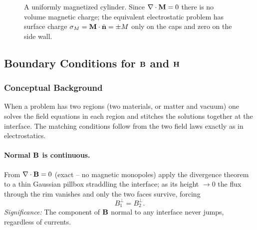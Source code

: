 \begin{figure}[h]
\centering
{}
\caption{A uniformly magnetized cylinder. Since $\nabla \cdot\mathbf{M}=0$ there is no volume
magnetic charge; the equivalent electrostatic problem has surface charge
$\sigma_M=\mathbf{M}\cdot\hat{\mathbf{n}}=\pm M$ only on the caps and zero on the side wall.}
\label{fig:lec18-bar-magnet}
\end{figure}

\subsection{Boundary Conditions for $\mathbf{B}$ and $\mathbf{H}$}\label{subsec:lec18-bc}

\subsubsection*{Conceptual Background}
When a problem has two regions (two materials, or matter and vacuum) one solves the
field equations in each region and stitches the solutions together at the interface. The
matching conditions follow from the two field laws exactly as in electrostatics.

\paragraph{Normal $\mathbf{B}$ is continuous.}
From $\nabla \cdot\mathbf{B}=0$ (exact -- no magnetic monopoles) apply the divergence theorem to a
thin Gaussian pillbox straddling the interface; as its height $\to0$ the flux through the
rim vanishes and only the two faces survive, forcing
\begin{equation}\label{eq:lec18-Bperp}
  \boxed{B^{\perp}_{1}=B^{\perp}_{2}.}
\end{equation}
\textit{Significance:} The component of $\mathbf{B}$ normal to any interface never jumps,
regardless of currents.

